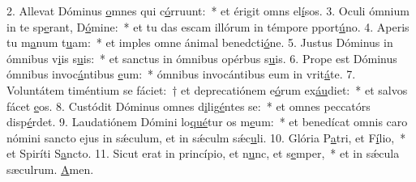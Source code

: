 2. Allevat Dóminus \uline{o}mnes qui c\uline{ó}rruunt:~* et érigit omns el\uline{í}sos.
3. Oculi ómnium in te sp\uline{e}rant, D\uline{ó}mine:~* et tu das escam illórum in témpore pport\uline{ú}no.
4. Aperis tu m\uline{a}num t\uline{u}am:~* et imples omne ánimal benedcti\uline{ó}ne.
5. Justus Dóminus in ómnibus v\uline{i}is s\uline{u}is:~* et sanctus in ómnibus opérbus s\uline{u}is.
6. Prope est Dóminus ómnibus invoc\uline{á}ntibus \uline{e}um:~* ómnibus invocántibus eum in vrit\uline{á}te.
7. Voluntátem timéntium se fáciet:~† et deprecatiónem e\uline{ó}rum ex\uline{áu}diet:~* et salvos fácet \uline{e}os.
8. Custódit Dóminus omnes d\uline{i}lig\uline{é}ntes se:~* et omnes peccatórs disp\uline{é}rdet.
9. Laudatiónem Dómini lo\uline{qué}tur os m\uline{e}um:~* et benedícat omnis caro nómini sancto ejus in sǽculum, et in sǽculm sǽc\uline{u}li.
10. Glória P\uline{a}tri, et F\uline{í}lio,~* et Spiríti S\uline{a}ncto.
11. Sicut erat in princípio, et n\uline{u}nc, et s\uline{e}mper,~* et in sǽcula sæculrum. \uline{A}men.
